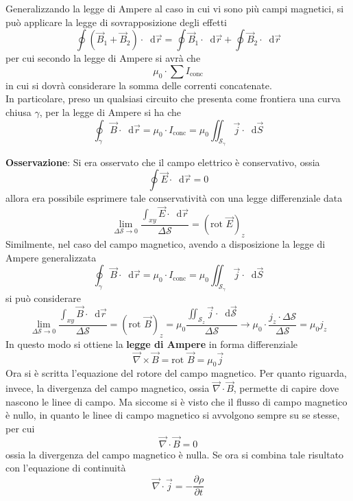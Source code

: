 \documentclass[a4paper]{extarticle}
\newcommand\dif{\mathop{}\!\mathrm{d}}
\begin{document}
\vspace{2em}
\noindent
Generalizzando la legge di Ampere al caso in cui vi sono più campi magnetici, si può applicare la legge di sovrapposizione degli effetti
\[\oint (\vec B_1 + \vec B_2) \cdot \dif \vec r = \oint \vec B_1 \cdot \dif \vec r + \oint \vec B_2 \cdot \dif \vec r\]
per cui secondo la legge di Ampere si avrà che
\[\mu_0 \cdot \sum I_\text{conc}\]
in cui si dovrà considerare la somma delle correnti concatenate.\\
In particolare, preso un qualsiasi circuito che presenta come frontiera una curva chiusa $\gamma$, per la legge di Ampere si ha che
\[\oint_\gamma \vec B \cdot \dif \vec r = \mu_0 \cdot I_\text{conc} = \mu_0 \iint_{\mathcal{S}_\gamma} \vec j \cdot \dif \vec S\]

\vspace{2em}
\noindent
\textbf{Osservazione}: Si era osservato che il campo elettrico è conservativo, ossia
\[\oint \vec E \cdot \dif \vec r = 0\]
allora era possibile esprimere tale conservatività con una legge differenziale data
\[\lim_{\Delta \mathcal{S} \to 0} \dfrac{\displaystyle{\int_{xy} \vec E \cdot \dif \vec r}}{\Delta \mathcal{S}} = (\text{rot } \vec E)_z\]
Similmente, nel caso del campo magnetico, avendo a disposizione la legge di Ampere generalizzata
\[\oint_\gamma \vec B \cdot \dif \vec r = \mu_0 \cdot I_\text{conc} = \mu_0 \iint_{\mathcal{S}_\gamma} \vec j \cdot \dif \vec S\]
si può considerare
\[\lim_{\Delta \mathcal{S} \to 0} \dfrac{\displaystyle{\int_{xy} \vec B \cdot \dif \vec r}}{\Delta \mathcal{S}} = (\text{rot } \vec B)_z = \mu_0 \dfrac{\displaystyle{\iint_{\mathcal{S}_z} \vec j \cdot \dif \vec{\mathcal{S}}}}{\Delta \mathcal{S}} \to \mu_0 \cdot \dfrac{j_z \cdot \Delta \mathcal{S}}{\Delta \mathcal{S}} = \mu_0 j_z\]
In questo modo si ottiene la \textbf{legge di Ampere} in forma differenziale
\[\boxed{\vec \nabla \times \vec B = \text{rot } \vec B = \mu_0 \vec j}\]
Ora si è scritta l'equazione del rotore del campo magnetico. Per quanto riguarda, invece, la divergenza del campo magnetico, ossia $\vec \nabla \cdot \vec B$, permette di capire dove nascono le linee di campo. Ma siccome si è visto che il flusso di campo magnetico è nullo, in quanto le linee di campo magnetico si avvolgono sempre su se stesse, per cui
\[\vec \nabla \cdot \vec B = 0\]
ossia la divergenza del campo magnetico è nulla. Se ora si combina tale risultato con l'equazione di continuità
\[\vec \nabla \cdot \vec j = - \frac{\partial \rho}{\partial t}\]
\end{document}
